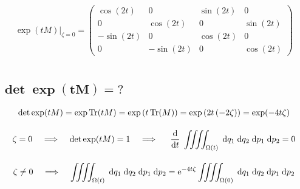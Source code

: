 \documentclass[10pt,a4paper]{article}
\newcommand{\const}[1]{\text{\rmfamily\upshape #1}}
\newcommand{\mat}[1]{
    \begin{pmatrix}
        #1
    \end{pmatrix}
}
\renewcommand{\d}[1]{\;\const{d}#1}
\newcommand{\dd}[2]{\frac{\const{d} #1}{\const{d} #2} \;}
\newcommand{\e}[1]{\const{e}^{#1}}
\newcommand{\Tr}{\operatorname{Tr}}
\begin{document}
\begin{gather*}
    \\[25pt]
    \exp(tM) |_{\zeta=0} = \mat{\cos{\left(2 t \right)} & 0 & \sin{\left(2 t \right)} & 0\\0 & \cos{\left(2 t \right)} & 0 & \sin{\left(2 t \right)}\\- \sin{\left(2 t \right)} & 0 & \cos{\left(2 t \right)} & 0\\0 & - \sin{\left(2 t \right)} & 0 & \cos{\left(2 t \right)}}
    \\[25pt]
\end{gather*}

\subsection{
    \texorpdfstring{
        $\pmb{ \det\exp(tM) = \mathit{?} }$
    }{
        det exp(tM) = ?
    }
}
\begin{gather*}
    \det \exp(tM) = \exp \Tr(tM) =
    \exp\left( t \Tr(M) \right) =
    \exp\left( 2t \left(-2\zeta\right) \right) =
    \exp(-4t\zeta)
    \\[10pt]
    \zeta = 0 \;\;\; \implies \;\;\;
    \det\exp(tM) = 1 \;\;\; \implies \;\;\;\
    \dd{}{t}
    \iiiint_{\Omega(t)}
    \d{q_1} \d{q_2} \d{p_1} \d{p_2} = 0
    \\[10pt]
    \zeta \neq 0 \;\;\; \implies \;\;\;
    \iiiint_{\Omega(t)}
    \d{q_1} \d{q_2} \d{p_1} \d{p_2}
    =
    \e{-4 t \zeta}
    \iiiint_{\Omega(0)}
    \d{q_1} \d{q_2} \d{p_1} \d{p_2}
\end{gather*}
\end{document}
